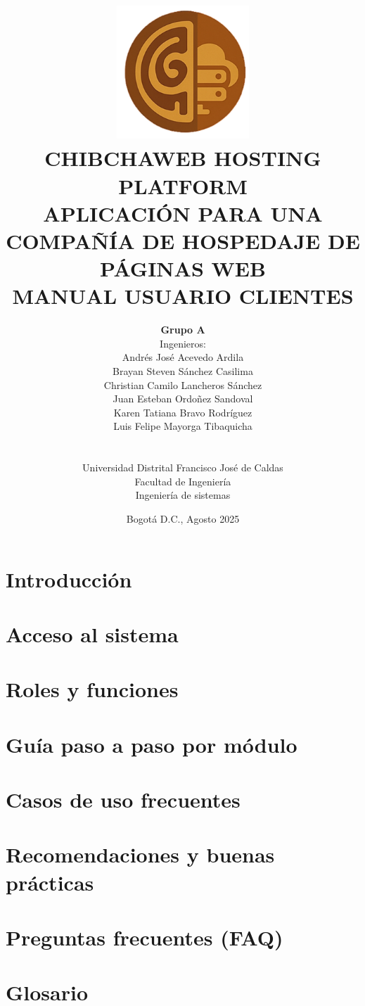 \documentclass[a4paper, 12pt]{article}
\title{
\includegraphics[width=5cm]{logo.png}\\

{\Large CHIBCHAWEB HOSTING PLATFORM}\\
{\Large APLICACIÓN PARA UNA COMPAÑÍA DE HOSPEDAJE DE PÁGINAS WEB}\\[0.5em]

\textbf{MANUAL USUARIO CLIENTES}\\[0.5em]
}
\author{
\textbf{Grupo A}\\[0.5em]
Ingenieros:\\
Andrés José Acevedo Ardila\\
Brayan Steven Sánchez Casilima\\
Christian Camilo Lancheros Sánchez\\
Juan Esteban Ordoñez Sandoval\\
Karen Tatiana Bravo Rodríguez\\
Luis Felipe Mayorga Tibaquicha\\\\\\
Universidad Distrital Francisco José de Caldas\\
Facultad de Ingeniería\\
Ingeniería de sistemas\\
}
\date{Bogotá D.C., Agosto 2025}
\begin{document}
\maketitle
\newpage



\tableofcontents

\newpage
\section{Introducción}


\newpage
\section{Acceso al sistema}


\newpage
\section{Roles y funciones}


\newpage
\section{Guía paso a paso por módulo}


\newpage
\section{Casos de uso frecuentes}


\newpage
\section{Recomendaciones y buenas prácticas}


\newpage
\section{Preguntas frecuentes (FAQ)}


\newpage
\section{Glosario}




\end{document}
